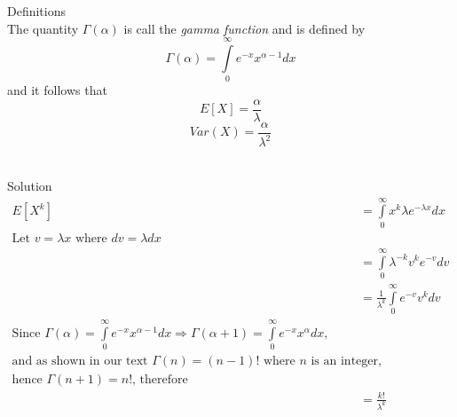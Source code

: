 \documentclass{article}
\begin{document}
\begin{spacing}{1.1}
\begin{homeworkProblem}
\begin{homeworkSection}{Definitions}
\[    \]
    The quantity $\Gamma( \alpha)$ is call the \emph{gamma function}
    and is defined by
      \[\Gamma( \alpha) = \int\limits_0^\infty e^{-x} x^{\alpha - 1} dx\]
    and it follows that
      \[E[ X] = \frac{ \alpha}{ \lambda}\]
      \[Var(X) = \frac{ \alpha}{ \lambda^2}\]\\
  \end{homeworkSection}
  \begin{homeworkSection}{Solution}
    \begin{align*}
      E[ X^k] &= \int\limits_0^\infty x^k \lambda e^{-\lambda x} dx\\
      \text{Let $v = \lambda x$ where $dv = \lambda d x$}\\
      &= \int\limits_0^\infty \lambda^{-k} v^k e^{-v} dv\\
      &= \frac{ 1}{ \lambda^k} \int\limits_0^\infty e^{-v} v^k dv\\
      \text{Since $\Gamma( \alpha) = \int\limits_0^\infty e^{-x} x^{\alpha -1} dx
      \Rightarrow \Gamma( \alpha + 1) = \int\limits_0^\infty e^{-x} x^{\alpha} dx$,}\\
      \text{and as shown in our text $\Gamma( n) = (n - 1)!$ where $n$ is an integer,}\\
      \text{hence $\Gamma( n + 1) = n!$, therefore}\\
      &= \frac{ k!}{ \lambda^k}
    \end{align*}
    
  \end{homeworkSection}
\end{homeworkProblem}


\end{spacing}
\end{document}
